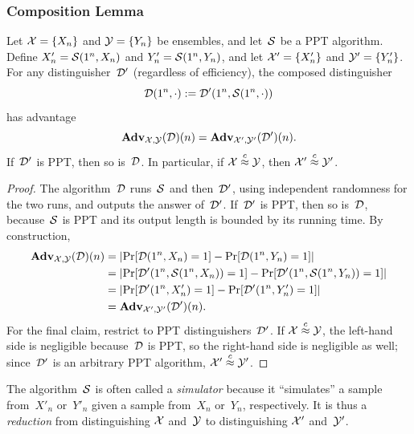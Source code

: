 \documentclass[11pt]{article}
\begin{document}
\subsubsection{Composition Lemma}

\begin{lemma}
  \label{lem:composition}
  Let $\calX = \set{X_{n}}$ and $\calY = \set{Y_{n}}$ be ensembles, and let~$\Sim$ be a PPT algorithm.
  Define $X'_{n}=\Sim(1^{n},X_{n})$ and $Y'_{n}=\Sim(1^{n},Y_{n})$, and let $\calX'=\set{X'_{n}}$ and $\calY'=\set{Y'_{n}}$.
  For any distinguisher~$\Dist'$ (regardless of efficiency), the composed distinguisher
  \[
    \Dist(1^{n},\cdot) := \Dist'(1^{n},\Sim(1^{n},\cdot))
  \]
  has advantage
  \[
    \advan_{\calX,\calY}(\Dist)(n) = \advan_{\calX',\calY'}(\Dist')(n)\text.
  \]
  If~$\Dist'$ is PPT, then so is~$\Dist$.
  In particular, if $\calX \compind \calY$, then $\calX' \compind \calY'$.
\end{lemma}

\begin{proof}
  The algorithm~$\Dist$ runs~$\Sim$ and then~$\Dist'$, using independent randomness for the two runs, and outputs the answer of~$\Dist'$.
  If~$\Dist'$ is PPT, then so is~$\Dist$, because~$\Sim$ is PPT and its output length is bounded by its running time.
  By construction,
  \[
    \begin{aligned}
      \advan_{\calX,\calY}(\Dist)(n)
      &= \abs*{\Pr[\Dist(1^{n},X_{n})=1] - \Pr[\Dist(1^{n},Y_{n})=1]} \\
      &= \abs*{\Pr[\Dist'(1^{n},\Sim(1^{n},X_{n}))=1]
        - \Pr[\Dist'(1^{n},\Sim(1^{n},Y_{n}))=1]} \\
      &= \abs*{\Pr[\Dist'(1^{n},X'_{n})=1] - \Pr[\Dist'(1^{n},Y'_{n})=1]} \\
      &= \advan_{\calX',\calY'}(\Dist')(n)\text.
    \end{aligned}
  \]
  For the final claim, restrict to PPT distinguishers~$\Dist'$.
  If $\calX \compind \calY$, the left-hand side is negligible because~$\Dist$ is PPT, so the right-hand side is negligible as well; since~$\Dist'$ is an arbitrary PPT algorithm, $\calX' \compind \calY'$.
\end{proof}

The algorithm~$\Sim$ is often called a \emph{simulator} because it ``simulates'' a sample from~$X'_n$ or~$Y'_n$ given a sample from~$X_n$ or~$Y_n$, respectively.
It is thus a \emph{reduction} from distinguishing $\calX$ and~$\calY$ to distinguishing $\calX'$ and~$\calY'$.
\end{document}
